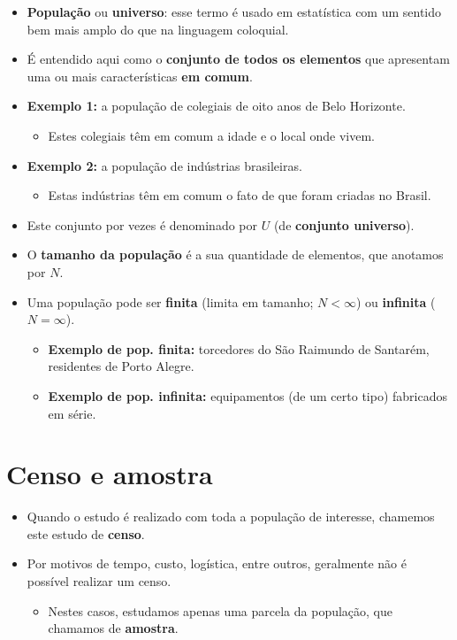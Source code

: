\documentclass[]{tufte-book}
\providecommand{\tightlist}{%
  \setlength{\itemsep}{0pt}\setlength{\parskip}{0pt}}
\begin{document}
\begin{itemize}
\tightlist
\item
  \textbf{População} ou \textbf{universo}: esse termo é usado em
  estatística com um sentido bem mais amplo do que na linguagem
  coloquial.
\item
  É entendido aqui como o \textbf{conjunto de todos os elementos} que
  apresentam uma ou mais características \textbf{em comum}.
\item
  \textbf{Exemplo 1:} a população de colegiais de oito anos de Belo
  Horizonte.

  \begin{itemize}
  \tightlist
  \item
    Estes colegiais têm em comum a idade e o local onde vivem.
  \end{itemize}
\item
  \textbf{Exemplo 2:} a população de indústrias brasileiras.

  \begin{itemize}
  \tightlist
  \item
    Estas indústrias têm em comum o fato de que foram criadas no Brasil.
  \end{itemize}
\item
  Este conjunto por vezes é denominado por \(U\) (de \textbf{conjunto
  universo}).
\item
  O \textbf{tamanho da população} é a sua quantidade de elementos, que
  anotamos por \(N\).
\item
  Uma população pode ser \textbf{finita} (limita em tamanho;
  \(N < \infty\)) ou \textbf{infinita} (\(N =\infty\)).

  \begin{itemize}
  \tightlist
  \item
    \textbf{Exemplo de pop. finita:} torcedores do São Raimundo de
    Santarém, residentes de Porto Alegre.
  \item
    \textbf{Exemplo de pop. infinita:} equipamentos (de um certo tipo)
    fabricados em série.
  \end{itemize}
\end{itemize}

\hypertarget{censo-e-amostra}{%
\section{Censo e amostra}\label{censo-e-amostra}}

\begin{itemize}
\tightlist
\item
  Quando o estudo é realizado com toda a população de interesse,
  chamemos este estudo de \textbf{censo}.
\item
  Por motivos de tempo, custo, logística, entre outros, geralmente não é
  possível realizar um censo.

  \begin{itemize}
  \tightlist
  \item
    Nestes casos, estudamos apenas uma parcela da população, que
    chamamos de \textbf{amostra}.
  \end{itemize}
\end{itemize}
\end{document}
